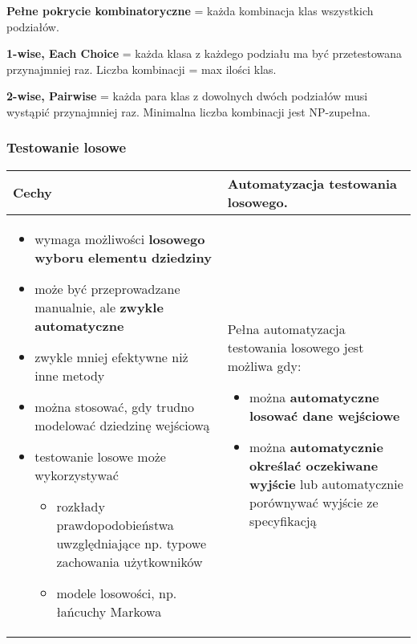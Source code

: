 \documentclass[../main.tex]{subfiles}
\begin{document}
    \textbf{Pełne pokrycie kombinatoryczne} = każda kombinacja klas wszystkich podziałów.

    \textbf{1-wise, Each Choice} = każda klasa z każdego podziału ma być przetestowana przynajmniej raz.
    Liczba kombinacji = max ilości klas.

    \textbf{2-wise, Pairwise} = każda para klas z dowolnych dwóch podziałów musi wystąpić przynajmniej raz. Minimalna
    liczba kombinacji jest NP-zupełna.

    \subsubsection{Testowanie losowe}


    \begin{table}[H]
        \begin{center}
            \begin{tabular}{ p{8cm} | p{8cm}}
                \textbf{Cechy} & \textbf{Automatyzacja testowania losowego}. \\
                \hline

                \begin{itemize}
                    \item wymaga możliwości \textbf{losowego wyboru elementu dziedziny}
                    \item może być przeprowadzane manualnie, ale \textbf{zwykle automatyczne}
                    \item zwykle mniej efektywne niż inne metody
                    \item można stosować, gdy trudno modelować dziedzinę wejściową
                    \item testowanie losowe może wykorzystywać
                    \begin{itemize}
                        \item rozkłady prawdopodobieństwa uwzględniające np. typowe
                        zachowania użytkowników
                        \item modele losowości, np. łańcuchy Markowa
                    \end{itemize}
                \end{itemize}

                &
                Pełna automatyzacja testowania losowego jest możliwa gdy:
                \begin{itemize}
                    \item można \textbf{automatyczne losować dane wejściowe}
                    \item można \textbf{automatycznie określać oczekiwane wyjście} lub automatycznie porównywać wyjście ze specyfikacją
                \end{itemize}



\end{tabular}
\end{center}
\end{table}
\end{document}
